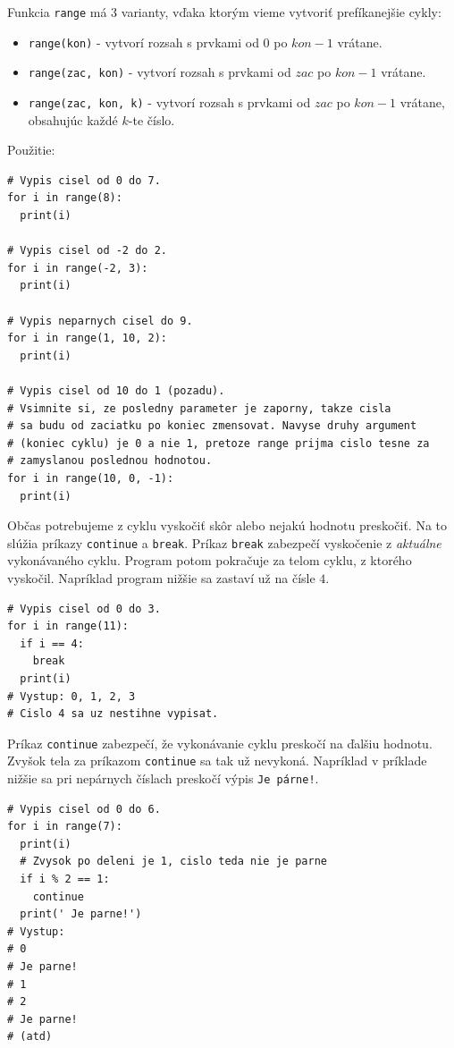 Funkcia \texttt{range} má 3 varianty, vďaka ktorým vieme vytvoriť prefíkanejšie cykly:
\begin{itemize}
  \item \texttt{range(kon)} - vytvorí rozsah s prvkami od $0$ po $kon - 1$ vrátane.
  \item \texttt{range(zac, kon)} - vytvorí rozsah s prvkami od $zac$ po $kon - 1$ vrátane.
  \item \texttt{range(zac, kon, k)} - vytvorí rozsah s prvkami od $zac$ po $kon - 1$ vrátane,
  obsahujúc každé $k$-te číslo.
\end{itemize} 

Použitie:
\begin{lstlisting}
# Vypis cisel od 0 do 7.
for i in range(8):
  print(i)

# Vypis cisel od -2 do 2.
for i in range(-2, 3):
  print(i)

# Vypis neparnych cisel do 9.
for i in range(1, 10, 2):
  print(i)

# Vypis cisel od 10 do 1 (pozadu).
# Vsimnite si, ze posledny parameter je zaporny, takze cisla
# sa budu od zaciatku po koniec zmensovat. Navyse druhy argument
# (koniec cyklu) je 0 a nie 1, pretoze range prijma cislo tesne za
# zamyslanou poslednou hodnotou.
for i in range(10, 0, -1):
  print(i)
\end{lstlisting}

Občas potrebujeme z cyklu vyskočiť skôr alebo nejakú hodnotu preskočiť. Na to slúžia príkazy \texttt{continue} a \texttt{break}. Príkaz \texttt{break} zabezpečí vyskočenie z \textit{aktuálne} vykonávaného cyklu. Program potom pokračuje za telom cyklu, z ktorého vyskočil. Napríklad program nižšie sa zastaví už na čísle $4$.
\begin{lstlisting}
# Vypis cisel od 0 do 3.
for i in range(11):
  if i == 4:
    break
  print(i)
# Vystup: 0, 1, 2, 3
# Cislo 4 sa uz nestihne vypisat.
\end{lstlisting}

Príkaz \texttt{continue} zabezpečí, že vykonávanie cyklu preskočí na ďalšiu hodnotu. Zvyšok tela za príkazom \texttt{continue} sa tak už nevykoná. Napríklad v príklade nižšie sa pri nepárnych číslach preskočí výpis 
\texttt{Je párne!}.
\begin{lstlisting}
# Vypis cisel od 0 do 6.
for i in range(7):
  print(i)
  # Zvysok po deleni je 1, cislo teda nie je parne
  if i % 2 == 1:
    continue
  print(' Je parne!')
# Vystup:
# 0 
# Je parne!
# 1
# 2
# Je parne!
# (atd)
\end{lstlisting}

